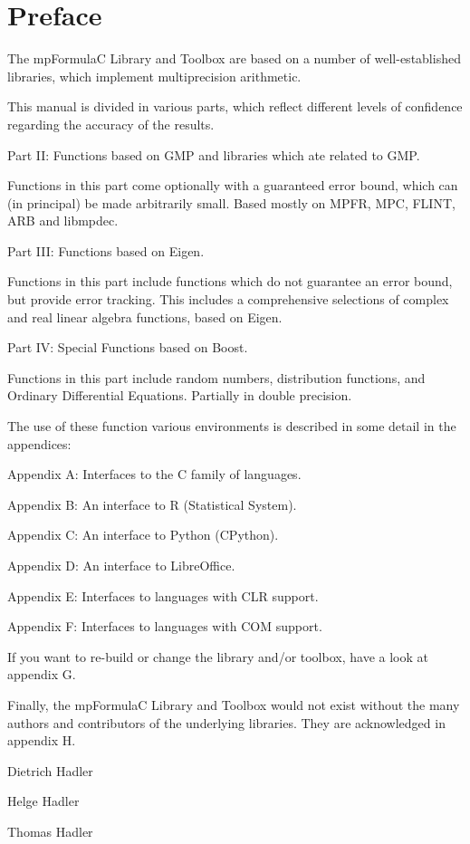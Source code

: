 \chapter{Preface}
\label{Preface} 

The mpFormulaC Library and Toolbox are based on a number of well-established libraries, which implement multiprecision arithmetic.

\vpara
This manual is divided in various parts, which reflect different levels of confidence regarding the accuracy of the results.

\vpara
Part II: Functions based on GMP and libraries which ate related to GMP.

Functions in this part come optionally with a guaranteed error bound, which can (in principal) be made arbitrarily small.  Based mostly on MPFR, MPC, FLINT, ARB and libmpdec.

\vpara
Part III: Functions based on Eigen.

Functions in this part include functions which do not guarantee an error bound, but provide error tracking. This includes a comprehensive selections of complex and real linear algebra functions, based on Eigen.

\vpara
Part IV: Special Functions based on Boost.

Functions in this part include random numbers, distribution functions, and Ordinary Differential Equations. Partially in double precision.


\vpara
The use of these function various environments is described in some detail in the appendices:

\vpara
Appendix A:  Interfaces to the C family of languages.

Appendix B:  An interface to R (Statistical System).

Appendix C:  An interface to Python (CPython).

Appendix D:  An interface to LibreOffice.

Appendix E:  Interfaces to languages with CLR support.

Appendix F:  Interfaces to languages with COM support.


\vpara
If you want to re-build or change the library and/or toolbox, have a look at appendix G.

\vpara
Finally, the mpFormulaC Library and Toolbox would not exist without the many authors and contributors of the underlying libraries. They are acknowledged in appendix H.


\vspace{0.6cm}
Dietrich Hadler

Helge Hadler

Thomas Hadler

